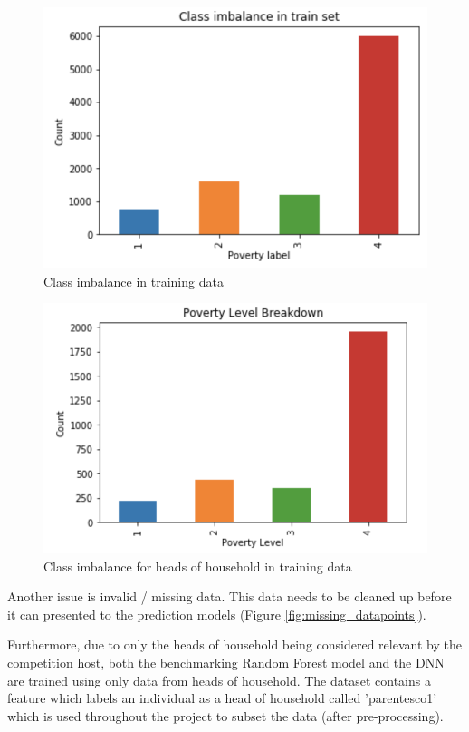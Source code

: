 \documentclass[preprint,12pt]{elsarticle}
\begin{document}
\begin{figure}[h!]
\centering\includegraphics[width=0.8\linewidth]{class_imbalance_full}
\caption{Class imbalance in training data}
\label{fig:class_imbalance_full}
\end{figure}

\begin{figure}[h!]
\centering\includegraphics[width=0.8\linewidth]{class_imbalance}
\caption{Class imbalance for heads of household in training data}
\label{fig:class_imbalance}
\end{figure}

Another issue is invalid / missing data. This data needs to be cleaned up before it can presented to the prediction models (Figure \ref{fig:missing_datapoints}).

Furthermore, due to only the heads of household being considered relevant by the competition host, both the benchmarking Random Forest model and the DNN are trained using only data from heads of household. The dataset contains a feature which labels an individual as a head of household called 'parentesco1' which is used throughout the project to subset the data (after pre-processing).
\end{document}

